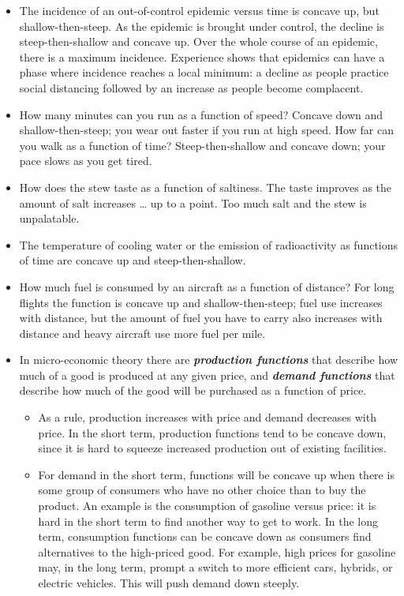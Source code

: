 \documentclass[
  letterpaper,
  DIV=11,
  numbers=noendperiod,
  oneside]{scrreprt}
\providecommand{\tightlist}{%
  \setlength{\itemsep}{0pt}\setlength{\parskip}{0pt}}
\begin{document}
\begin{itemize}
\item
  The incidence of an out-of-control epidemic versus time is concave up,
  but shallow-then-steep. As the epidemic is brought under control, the
  decline is steep-then-shallow and concave up. Over the whole course of
  an epidemic, there is a maximum incidence. Experience shows that
  epidemics can have a phase where incidence reaches a local minimum: a
  decline as people practice social distancing followed by an increase
  as people become complacent.
\item
  How many minutes can you run as a function of speed? Concave down and
  shallow-then-steep; you wear out faster if you run at high speed. How
  far can you walk as a function of time? Steep-then-shallow and concave
  down; your pace slows as you get tired.
\item
  How does the stew taste as a function of saltiness. The taste improves
  as the amount of salt increases \ldots{} up to a point. Too much salt
  and the stew is unpalatable.
\item
  The temperature of cooling water or the emission of radioactivity as
  functions of time are concave up and steep-then-shallow.
\item
  How much fuel is consumed by an aircraft as a function of distance?
  For long flights the function is concave up and shallow-then-steep;
  fuel use increases with distance, but the amount of fuel you have to
  carry also increases with distance and heavy aircraft use more fuel
  per mile.
\item
  In micro-economic theory there are \textbf{\emph{production
  functions}} that describe how much of a good is produced at any given
  price, and \textbf{\emph{demand functions}} that describe how much of
  the good will be purchased as a function of price.

  \begin{itemize}
  \tightlist
  \item
    As a rule, production increases with price and demand decreases with
    price. In the short term, production functions tend to be concave
    down, since it is hard to squeeze increased production out of
    existing facilities.\\
  \item
    For demand in the short term, functions will be concave up when
    there is some group of consumers who have no other choice than to
    buy the product. An example is the consumption of gasoline versus
    price: it is hard in the short term to find another way to get to
    work. In the long term, consumption functions can be concave down as
    consumers find alternatives to the high-priced good. For example,
    high prices for gasoline may, in the long term, prompt a switch to
    more efficient cars, hybrids, or electric vehicles. This will push
    demand down steeply.
  \end{itemize}
\end{itemize}
\end{document}
